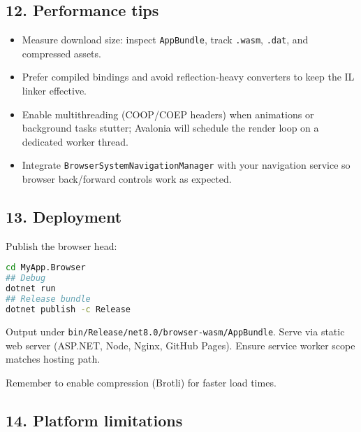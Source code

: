 \subsection{12. Performance tips}\label{performance-tips}

\begin{itemize}
\tightlist
\item
  Measure download size: inspect \passthrough{\lstinline!AppBundle!},
  track \passthrough{\lstinline!.wasm!}, \passthrough{\lstinline!.dat!},
  and compressed assets.
\item
  Prefer compiled bindings and avoid reflection-heavy converters to keep
  the IL linker effective.
\item
  Enable multithreading (COOP/COEP headers) when animations or
  background tasks stutter; Avalonia will schedule the render loop on a
  dedicated worker thread.
\item
  Integrate \passthrough{\lstinline!BrowserSystemNavigationManager!}
  with your navigation service so browser back/forward controls work as
  expected.
\end{itemize}

\subsection{13. Deployment}\label{deployment}

Publish the browser head:

\begin{lstlisting}[language=bash]
cd MyApp.Browser
## Debug
dotnet run
## Release bundle
dotnet publish -c Release
\end{lstlisting}

Output under
\passthrough{\lstinline!bin/Release/net8.0/browser-wasm/AppBundle!}.
Serve via static web server (ASP.NET, Node, Nginx, GitHub Pages). Ensure
service worker scope matches hosting path.

Remember to enable compression (Brotli) for faster load times.

\subsection{14. Platform limitations}\label{platform-limitations}

